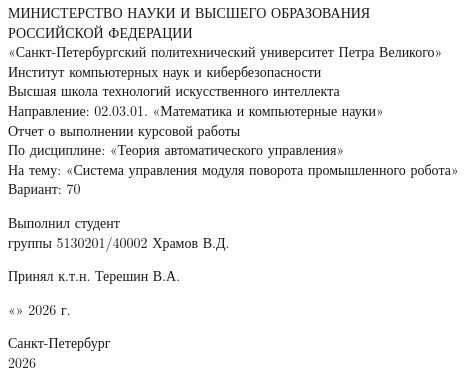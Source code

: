 \documentclass[a4paper, 14pt]{extarticle}
\begin{document}
\begin{titlepage}
	\thispagestyle{empty}
	\begin{center}
		{ \large МИНИСТЕРСТВО НАУКИ И ВЫСШЕГО ОБРАЗОВАНИЯ \\
			РОССИЙСКОЙ ФЕДЕРАЦИИ \\ }
		{ «Санкт-Петербургский политехнический университет Петра Великого» \\}
		{ Институт компьютерных наук и кибербезопасности \\
			Высшая школа технологий искусственного интеллекта \\
			Направление: 02.03.01. «Математика и компьютерные науки» \\ }
		\vspace{3cm}
		{ \large Отчет о выполнении курсовой работы \\
			По дисциплине: «Теория автоматического управления» \\
			На тему: «Система управления модуля поворота промышленного робота» \\
			Вариант: 70}
	\end{center}
	\vspace{3cm}
	\begin{center}
		\noindent
		\begin{minipage}[t]{\textwidth}
			\raggedright Выполнил студент \\ группы 5130201/40002 \hfill
			\underline{\hspace{3cm}} Храмов В.Д.
		\end{minipage}
		\vspace{1cm}

		\noindent
		\begin{minipage}[t]{\textwidth}
			\raggedright Принял к.т.н. \hfill
			\underline{\hspace{3cm}}  Терешин В.А.
		\end{minipage}
	\end{center}
	\vspace{1cm}
	\begin{flushright}
		\large
		«\underline{\hspace{1cm}}» \underline{\hspace{3cm}} 2026 г.
	\end{flushright}
	\vspace{0.5cm}
	\vfill
	\begin{center}
		Санкт-Петербург \\
		2026
	\end{center}
\end{titlepage}
\setcounter{page}{2}
\end{document}
